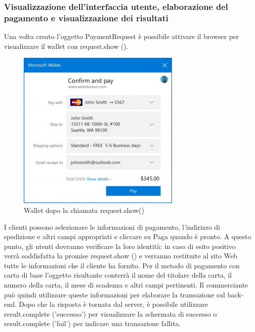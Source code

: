 \documentclass[italian]{article}
\begin{document}
	\subsubsection{Visualizzazione dell'interfaccia utente, elaborazione del pagamento e visualizzazione dei risultati}
	Una volta creato l'oggetto PaymentRequest è possibile attivare il browser per visualizzare il wallet con request.show (). 
	\begin{figure}[h]
		\centering
		\includegraphics[width=1\linewidth]{wallet1}
		\caption{Wallet dopo la chiamata request.show()}
		\label{fig: Wallet dopo la chiamata request.show()}
	\end{figure}

	I clienti possono  selezionare le informazioni di pagamento, l'indirizzo di spedizione e altri campi appropriati e cliccare su Paga quando è pronto. A questo punto, gli utenti dovranno verificare la loro identità: in caso di esito positivo verrà soddisfatta la promise request.show () e verranno restituite al sito Web tutte le informazioni che il cliente ha fornito. Per il metodo di pagamento con carta di base l'oggetto risultante conterrà il nome del titolare della carta, il numero della carta, il mese di scadenza e altri campi pertinenti. Il commerciante può quindi utilizzare queste informazioni per elaborare la transazione sul back-end.
	Dopo che la risposta è tornata dal server, è possibile utilizzare result.complete ('successo') per visualizzare la schermata di successo o result.complete ('fail') per indicare una transazione fallita.
\end{document}
